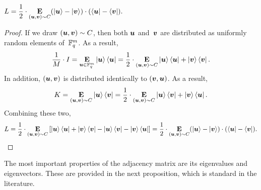 \begin{proposition}\label{prop:laplacian-rewrite}
$\displaystyle L = \frac{1}{2} \cdot \E_{(\bu, \bv) \sim C} (\ket{\bu} - \ket{\bv}) \cdot (\bra{\bu} - \bra{\bv}).$
\end{proposition}
\begin{proof}
If we draw $(\bu, \bv) \sim C$, then both $\bu$ and~$\bv$ are distributed as uniformly random elements of~$\F_q^m$. As a result,
\begin{equation*}
\frac{1}{M} \cdot I = \E_{\bu \in \F_q^m} \ket{\bu}\bra{\bu} = \frac{1}{2}\cdot\E_{(\bu, \bv) \sim C}  \ket{\bu}\bra{\bu} + \ket{\bv}\bra{\bv}.
\end{equation*}
In addition, $(\bu, \bv)$ is distributed identically to $(\bv, \bu)$. As a result,
\begin{equation*}
K =  \E_{(\bu, \bv) \sim C} \ket{\bu}\bra{\bv} = \frac{1}{2} \cdot \E_{(\bu, \bv) \sim C} \ket{\bu}\bra{\bv} + \ket{\bv}\bra{\bu}.
\end{equation*}
Combining these two,
\begin{equation*}
L = \frac{1}{2}\cdot\E_{(\bu, \bv) \sim C} \left[\ket{\bu}\bra{\bu} + \ket{\bv}\bra{\bv} - \ket{\bu}\bra{\bv} - \ket{\bv}\bra{\bu}\right]
= \frac{1}{2} \cdot \E_{(\bu, \bv) \sim C} (\ket{\bu} - \ket{\bv}) \cdot (\bra{\bu} - \bra{\bv}).\qedhere
\end{equation*}
\end{proof}

The most important properties of the adjacency matrix are its eigenvalues and eigenvectors. These are provided in the next proposition, which is standard in the literature.

